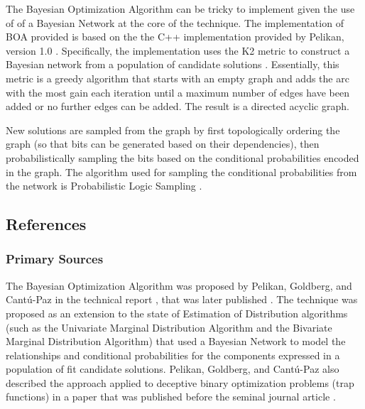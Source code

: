 The Bayesian Optimization Algorithm can be tricky to implement given the use of of a Bayesian Network at the core of the technique. The implementation of BOA provided is based on the the C++ implementation provided by Pelikan, version 1.0 \cite{Pelikan1999b}. Specifically, the implementation uses the K2 metric to construct a Bayesian network from a population of candidate solutions \cite{Cooper1992}. Essentially, this metric is a greedy algorithm that starts with an empty graph and adds the arc with the most gain each iteration until a maximum number of edges have been added or no further edges can be added. The result is a directed acyclic graph. 

New solutions are sampled from the graph by first topologically ordering the graph (so that bits can be generated based on their dependencies), then probabilistically sampling the bits based on the conditional probabilities encoded in the graph. The algorithm used for sampling the conditional probabilities from the network is Probabilistic Logic Sampling \cite{Henrion1988}.



\subsection{References}

% 
% 
\subsubsection{Primary Sources}
The Bayesian Optimization Algorithm was proposed by Pelikan, Goldberg, and Cant\'u-Paz in the technical report \cite{Pelikan1998a}, that was later published \cite{Pelikan2002}. The technique was proposed as an extension to the state of Estimation of Distribution algorithms (such as the Univariate Marginal Distribution Algorithm and the Bivariate Marginal Distribution Algorithm) that used a Bayesian Network to model the relationships and conditional probabilities for the components expressed in a population of fit candidate solutions.
Pelikan, Goldberg, and Cant\'u-Paz also described the approach applied to deceptive binary optimization problems (trap functions) in a paper that was published before the seminal journal article \cite{Pelikan1999a}.

